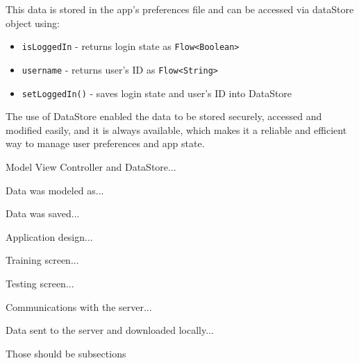 This data is stored in the app's preferences file and can be accessed via dataStore object using:
\begin{itemize}
	\item \texttt{isLoggedIn} - returns login state as \texttt{Flow<Boolean>}
	\item \texttt{username} - returns user's ID as \texttt{Flow<String>}
	\item \texttt{setLoggedIn()} - saves login state and user's ID into DataStore
\end{itemize}
The use of DataStore enabled the data to be stored securely, accessed and modified easily, and it is always available, which makes it a reliable and efficient way to manage user preferences and app state.

Model View Controller and DataStore...

Data was modeled as...

Data was saved...

Application design...

Training screen...

Testing screen...

Communications with the server...

Data sent to the server and downloaded locally...

Those should be subsections